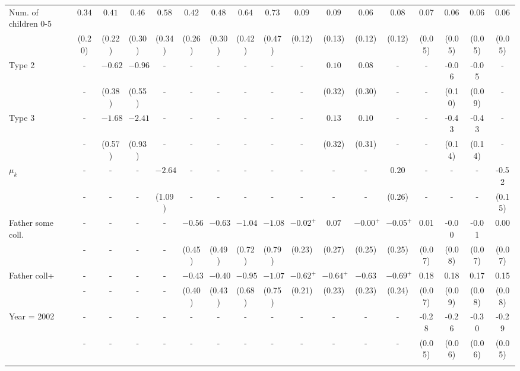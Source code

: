 \begin{tabular}{lcccccccccccccccc}
Num. of children 0-5&$0.34$&$0.41$&$0.46$&$0.58$&$0.42$&$0.48$&$0.64$&$0.73$&$0.09$&$0.09$&$0.06$&$0.08$&0.07&0.06&0.06&0.06\\
&(0.20)&(0.22)&(0.30)&(0.34)&(0.26)&(0.30)&(0.42)&(0.47)&(0.12)&(0.13)&(0.12)&(0.12)&(0.05)&(0.05)&(0.05)&(0.05)\\
Type 2&-&$-0.62$&$-0.96$&-&-&-&-&-&-&$0.10$&$0.08$&-&-&-0.06&-0.05&-\\
&-&(0.38)&(0.55)&-&-&-&-&-&-&(0.32)&(0.30)&-&-&(0.10)&(0.09)&-\\
Type 3&-&$-1.68$&$-2.41$&-&-&-&-&-&-&$0.13$&$0.10$&-&-&-0.43&-0.43&-\\
&-&(0.57)&(0.93)&-&-&-&-&-&-&(0.32)&(0.31)&-&-&(0.14)&(0.14)&-\\
$\mu_{k}$&-&-&-&$-2.64$&-&-&-&-&-&-&-&$0.20$&-&-&-&-0.52\\
&-&-&-&(1.09)&-&-&-&-&-&-&-&(0.26)&-&-&-&(0.15)\\
Father some coll.&-&-&-&-&$-0.56$&$-0.63$&$-1.04$&$-1.08$&$-0.02^{+}$&$0.07$&$-0.00^{+}$&$-0.05^{+}$&0.01&-0.00&-0.01&0.00\\
&-&-&-&-&(0.45)&(0.49)&(0.72)&(0.79)&(0.23)&(0.27)&(0.25)&(0.25)&(0.07)&(0.08)&(0.07)&(0.07)\\
Father coll+&-&-&-&-&$-0.43$&$-0.40$&$-0.95$&$-1.07$&$-0.62^{+}$&$-0.64^{+}$&$-0.63$&$-0.69^{+}$&0.18&0.18&0.17&0.15\\
&-&-&-&-&(0.40)&(0.43)&(0.68)&(0.75)&(0.21)&(0.23)&(0.23)&(0.24)&(0.07)&(0.09)&(0.08)&(0.08)\\
Year = 2002&-&-&-&-&-&-&-&-&-&-&-&-&-0.28&-0.26&-0.30&-0.29\\
&-&-&-&-&-&-&-&-&-&-&-&-&(0.05)&(0.06)&(0.06)&(0.05)\\
\\
\bottomrule\end{tabular}